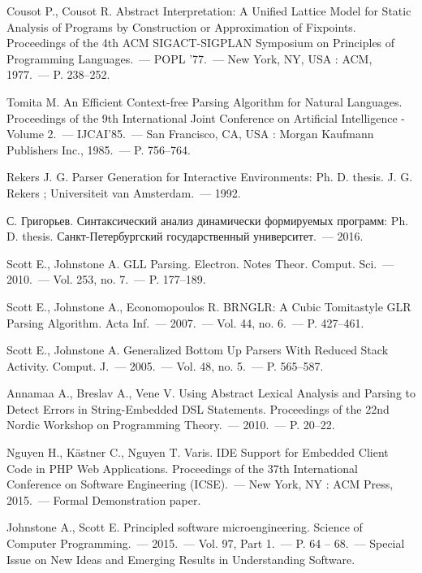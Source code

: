 \begin{thebibliography}{99}
  Cousot P., Cousot R. 
  Abstract Interpretation: A Unified Lattice Model for Static Analysis of Programs by Construction or Approximation of Fixpoints.
  Proceedings of the 4th ACM SIGACT-SIGPLAN Symposium on Principles of Programming Languages.~--- POPL ’77.~--- New York, NY, USA : ACM, 1977.~--- P. 238–252. 

  Tomita M.
  An Efficient Context-free Parsing Algorithm for Natural Languages.
  Proceedings of the 9th International Joint Conference on Artificial Intelligence - Volume 2.~--- IJCAI’85.~--- San Francisco, CA, USA : Morgan Kaufmann Publishers Inc., 1985.~--- P. 756–764. 

  Rekers J. G. 
  Parser Generation for Interactive Environments: Ph. D. thesis. 
  J. G. Rekers ; Universiteit van Amsterdam.~--- 1992.

  С. Григорьев. 
  Синтаксический анализ динамически формируемых программ: Ph. D. thesis.
  Санкт-Петербургский государственный университет.~--- 2016.

  Scott E., Johnstone A. 
  GLL Parsing. 
  Electron. Notes Theor. Comput. Sci.~--- 2010.~--- Vol. 253, no. 7.~--- P. 177–189.

  Scott E., Johnstone A., Economopoulos R. 
  BRNGLR: A Cubic Tomitastyle GLR Parsing Algorithm. 
  Acta Inf.~--- 2007.~--- Vol. 44, no. 6.~--- P. 427–461.

  Scott E., Johnstone A. 
  Generalized Bottom Up Parsers With Reduced Stack Activity.
  Comput. J.~--- 2005.~--- Vol. 48, no. 5.~--- P. 565–587.

  Annamaa A., Breslav A., Vene V. 
  Using Abstract Lexical Analysis and Parsing to Detect Errors in String-Embedded DSL Statements. 
  Proceedings of the 22nd Nordic Workshop on Programming Theory.~--- 2010.~--- P. 20–22.
               
  Nguyen H., K{\"a}stner C., Nguyen T. Varis.
  IDE Support for Embedded Client Code in PHP Web Applications.
  Proceedings of the 37th International Conference on Software Engineering (ICSE).~--- New York, NY : ACM Press, 2015.~--- Formal Demonstration paper.

  Johnstone A., Scott E.
  Principled software microengineering.
  Science of Computer Programming.~--- 2015.~--- Vol. 97, Part 1.~--- P. 64 – 68.~--- Special Issue on New Ideas and Emerging Results in Understanding Software. 


\end{thebibliography}
